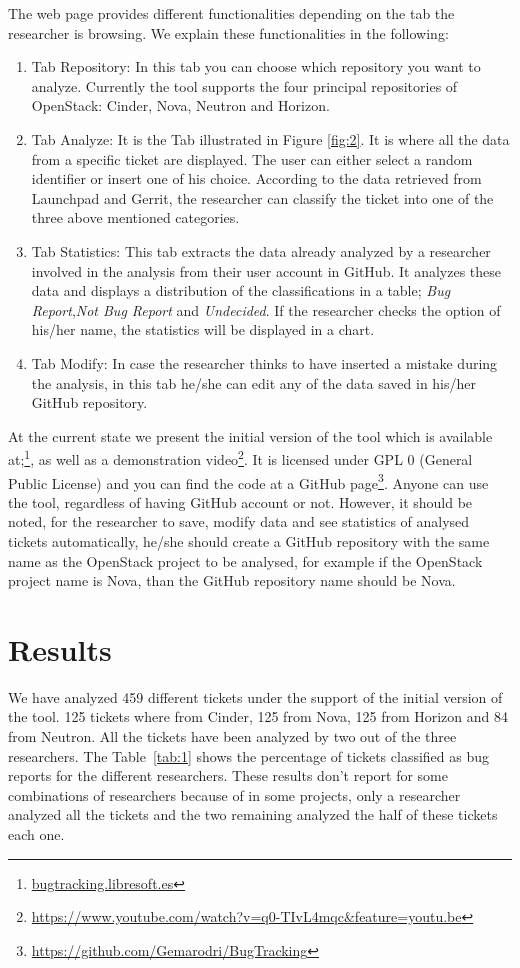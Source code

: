 \documentclass[runningheads,a4paper]{llncs}
\begin{document}
The web page provides different functionalities depending on the tab the researcher is browsing. We explain these functionalities in the following:
\begin{enumerate}
  \item Tab Repository: In this tab you can choose which repository you want to analyze. Currently the tool supports the four principal repositories of OpenStack: Cinder, Nova, Neutron and Horizon.
  \item Tab Analyze: It is the Tab illustrated in Figure \ref{fig:2}. It is where all the data from a specific ticket are displayed. The user can either select a random identifier or insert one of his choice. According to the data retrieved from Launchpad and Gerrit, the researcher can classify the ticket into one of the three above mentioned categories.
  \item Tab Statistics: This tab extracts the data already analyzed by a researcher involved in the analysis from their user account in GitHub. It analyzes these data and displays a distribution of the classifications in a table; \textit{Bug Report},\textit{Not Bug Report} and \textit{Undecided}. If the researcher checks the option of his/her name, the statistics will be displayed in a chart.
  \item Tab Modify: In case the researcher thinks to have inserted a mistake during the analysis, in this tab he/she can edit any of the data saved in his/her GitHub repository. 
\end{enumerate}

At the current state we present the initial version of the tool which is available at;\footnote{\url{bugtracking.libresoft.es}}, as well as a demonstration video\footnote{\url{https://www.youtube.com/watch?v=q0-TIvL4mqc&feature=youtu.be}}. It is licensed under GPL 0 (General Public License) and you can find the code at a GitHub page\footnote{\url{https://github.com/Gemarodri/BugTracking}}. Anyone can use the tool, regardless of having GitHub account or not. However, it should be noted, for the researcher to save, modify data and see statistics of analysed tickets automatically, he/she should create a GitHub repository with the same name as the OpenStack project to be analysed, for example if the OpenStack project name is Nova, than the GitHub repository name should be Nova. 

\section{Results}
\label{sec:4}
We have analyzed 459 different tickets under the support of the initial version of the tool. 125 tickets where from Cinder, 125 from Nova, 125 from Horizon and 84 from Neutron. All the tickets have been analyzed by two out of the three researchers. The Table~\ref{tab:1} shows the percentage of tickets classified as bug reports for the different researchers. These results don't report for some combinations of researchers because of in some projects, only a researcher analyzed all the tickets and the two remaining analyzed the half of these tickets each one. 
 
\end{document}
